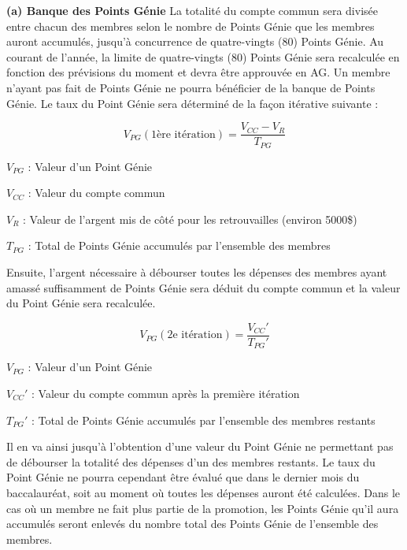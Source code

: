 \textbf{(a) Banque des Points Génie}
La totalité du compte commun sera divisée entre chacun des membres selon le nombre de Points Génie que les membres auront accumulés, jusqu’à concurrence de quatre-vingts (80) Points Génie. Au courant de l’année, la limite de quatre-vingts (80) Points Génie sera recalculée en fonction des prévisions du moment et devra être approuvée en AG. Un membre n’ayant pas fait de Points Génie ne pourra bénéficier de la banque de Points Génie. Le taux du Point Génie sera déterminé de la façon itérative suivante :

$$ V_{PG} (\text{1ère itération}) = \frac{V_{CC} - V_R}{T_{PG}} $$

\begin{description}
    \item $V_{PG}$ : Valeur d'un Point Génie
    \item $V_{CC}$ : Valeur du compte commun
    \item $V_{R}$ : Valeur de l'argent mis de côté pour les retrouvailles (environ 5000\$)
    \item $T_{PG}$ : Total de Points Génie accumulés par l'ensemble des membres
\end{description}

Ensuite, l’argent nécessaire à débourser toutes les dépenses des membres ayant amassé suffisamment de Points Génie sera déduit du compte commun et la valeur du Point Génie sera recalculée.

$$ V_{PG} (\text{2e itération}) = \frac{V_{CC}'}{T_{PG}'} $$

\begin{description}
    \item $V_{PG}$ : Valeur d'un Point Génie
    \item $V_{CC}'$ : Valeur du compte commun après la première itération
    \item $T_{PG}'$ : Total de Points Génie accumulés par l'ensemble des membres restants
\end{description}

Il en va ainsi jusqu’à l’obtention d’une valeur du Point Génie ne permettant pas de débourser la totalité des dépenses d’un des membres restants. Le taux du Point Génie ne pourra cependant être évalué que dans le dernier mois du baccalauréat, soit au moment où toutes les dépenses auront été calculées. Dans le cas où un membre ne fait plus partie de la promotion, les Points Génie qu’il aura accumulés seront enlevés du nombre total des Points Génie de l’ensemble des membres.


